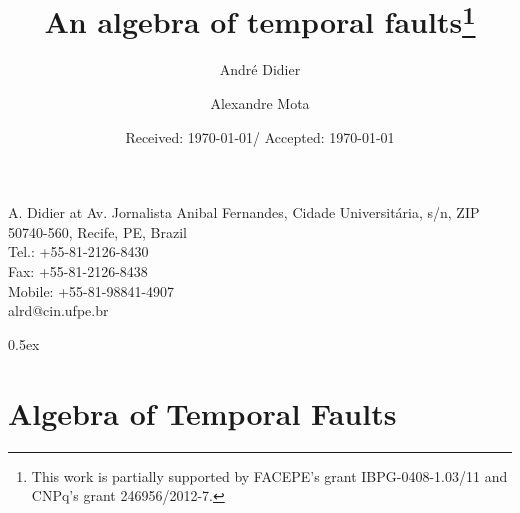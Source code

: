 \documentclass{article}
\newcommand{\email}[1]{#1}
\newcommand{\institute}[1]{#1}
\def\at{at}
\begin{document}
\title{An algebra of temporal faults\thanks{This work is partially supported by FACEPE's grant IBPG-0408-1.03/11 and CNPq's grant 246956/2012-7.}}

\author{André Didier \and Alexandre Mota}
\institute{A. Didier \at
              Av. Jornalista Anibal Fernandes, Cidade Universit\'{a}ria, s/n, ZIP 50740-560, Recife, PE, Brazil \\
              Tel.: +55-81-2126-8430\\
              Fax: +55-81-2126-8438\\
              Mobile: +55-81-98841-4907\\
              \email{alrd@cin.ufpe.br}%
}

\date{Received: \today / Accepted: \today}


%
\parindent 0pt\parskip 0.5ex

\section{Algebra of Temporal Faults}
\label{thm:xbefore-inf-1}
\label{thm:xbefore-inf-2}
\label{thm:xbefore-sup-absorb-2}
\label{thm:xbefore-sup-absorb-1}
\label{thm:xbefore_inf_absorb_1}
\label{thm:xbefore_inf_absorb_2}
\label{thm:and_xbefore_equiv_or_xbefore_expanded}
\label{thm:xbefore_sup_compl_inf_absorb1}
\label{def:algebraset-sup}
\label{def:algebraset-false}
\label{def:algebraset-true}
\label{def:algebraset-xbefore}
\label{def:algebraset-inf}
\label{def:algebraset-compl}
\label{def:algebraset-var}




%

%

%
%
\end{document}
